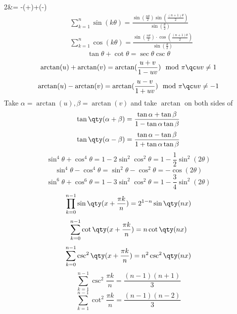 \documentclass[a4paper,12pt]{report}
\begin{document}
2\sin\alpha\sin\beta &= -\cos (\alpha +\beta)+\cos (\alpha -\beta)
\eam
{}
\[\begin{aligned}
& \sum_{k=1}^{n} \sin(k\theta) = \frac{\sin\left(\frac{n\theta}{2}\right) \sin\left(\frac{(n+1)\theta}{2}\right)}{\sin\left(\frac{\theta}{2}\right)}\\
& \sum_{k=1}^{n} \cos(k\theta) = \frac{\sin\left(\frac{n\theta}{2}\right) \cdot \cos\left(\frac{(n+1)\theta}{2}\right)}{\sin\left(\frac{\theta}{2}\right)}
\end{aligned}\]
\[\tan\theta+\cot\theta=\sec\theta\csc\theta\]
\[\arctan(u)+\arctan(v)=\arctan(\frac{u+v}{1-uv})\mod\pi\qc uv\ne1\]
\[\arctan(u)-\arctan(v)=\arctan(\frac{u-v}{1+uv})\mod\pi\qc uv\ne-1\]
\bpr
Take $\alpha=\arctan(u),\beta=\arctan(v)$ and take $\arctan$ on both sides of
\[\tan\qty(\alpha +\beta)=\frac{\tan\alpha+\tan\beta}{1-\tan\alpha\tan\beta}\]
\[\tan\qty(\alpha -\beta)=\frac{\tan\alpha-\tan\beta}{1+\tan\alpha\tan\beta}\]
\epr
{}
\[\sin^4\theta +\cos^4\theta = 1-2\sin^2\cos^2\theta=1-\frac{1}{2}\sin^2(2\theta)\]
\[\sin^4\theta -\cos^4\theta = \sin^2\theta -\cos^2\theta=-\cos(2\theta)\]
\[\sin^6\theta +\cos^6\theta = 1-3\sin^2\cos^2\theta=1-\frac{3}{4}\sin^2(2\theta)\]
\[\prod_{k=0}^{n-1}\sin\qty(x+\frac{\pi k}{n})=2^{1-n}\sin\qty(nx)\]
\[\sum_{k=0}^{n-1}\cot\qty(x+\frac{\pi k}{n})=n\cot\qty(nx)\]
\[\sum_{k=0}^{n-1}\csc^2\qty(x+\frac{\pi k}{n})=n^2\csc^2\qty(nx)\]
\[\sum_{k=1}^{n-1}\csc^2\frac{\pi k}{n}=\frac{(n-1)(n+1)}{3}\]
\[\sum_{k=1}^{n-1}\cot^2\frac{\pi k}{n}=\frac{(n-1)(n-2)}{3}\]
\end{document}
